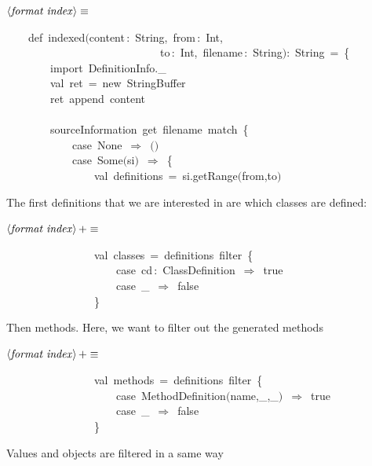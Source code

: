 \documentclass[a4paper,12pt]{article}
\begin{document}
$\left<\mbox{\emph{format index}}\right>\equiv$
\begin{program}~~~~{\vem def}~indexed$($content\,{\rm :}~String,~from\,{\rm :}~Int,
\\~~~~~~~~~~~~~~~~~~~~~~~~~~~~to\,{\rm :}~Int,~filename\,{\rm :}~String$)${\rm :}~String~=~{\small\{}
\\~~~~~~~~{\vem import}~DefinitionInfo.\_
\\~~~~~~~~{\vem val}~ret~=~{\vem new}~StringBuffer
\\~~~~~~~~ret~append~content
\\~~~~~~~~
\\~~~~~~~~sourceInformation~get~filename~{\vem match}~{\small\{}
\\~~~~~~~~~~~~{\vem case}~None~$\Rightarrow$~$($$)$
\\~~~~~~~~~~~~{\vem case}~Some$($si$)$~$\Rightarrow$~{\small\{}
\\~~~~~~~~~~~~~~~~{\vem val}~definitions~=~si.getRange$($from,to$)$
\\[0.5em]\end{program}
The first definitions that we are interested in are which classes
are defined:

$\left<\mbox{\emph{format index}}\right>+\equiv$
\begin{program}~~~~~~~~~~~~~~~~{\vem val}~classes~=~definitions~filter~{\small\{}
\\~~~~~~~~~~~~~~~~~~~~{\vem case}~cd\,{\rm :}~ClassDefinition~$\Rightarrow$~{\vem true}
\\~~~~~~~~~~~~~~~~~~~~{\vem case}~\_~$\Rightarrow$~{\vem false}
\\~~~~~~~~~~~~~~~~{\small\}}
\\[0.5em]\end{program}
Then methods. Here, we want to filter out the generated methods

$\left<\mbox{\emph{format index}}\right>+\equiv$
\begin{program}~~~~~~~~~~~~~~~~{\vem val}~methods~=~definitions~filter~{\small\{}
\\~~~~~~~~~~~~~~~~~~~~{\vem case}~MethodDefinition$($name,\_,\_$)$~$\Rightarrow$~{\vem true}
\\~~~~~~~~~~~~~~~~~~~~{\vem case}~\_~$\Rightarrow$~{\vem false}
\\~~~~~~~~~~~~~~~~{\small\}}
\\[0.5em]\end{program}
Values and objects are filtered in a same way
\end{document}
